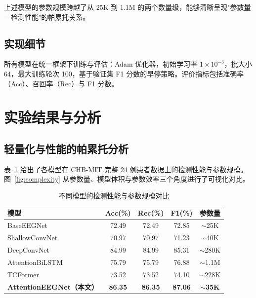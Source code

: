\documentclass[12pt, a4paper]{article}
\begin{document}
上述模型的参数规模跨越了从 25K 到 1.1M 的两个数量级，能够清晰呈现"参数量—检测性能"的帕累托关系。

\subsection{实现细节}

所有模型在统一框架下训练与评估：Adam 优化器\cite{ref_kingma2015}，初始学习率 $1 \times 10^{-3}$，批大小 64，最大训练轮次 100，基于验证集 F1 分数的早停策略。评价指标包括准确率（Acc）、召回率（Rec）与 F1 分数。

\section{实验结果与分析}

\subsection{轻量化与性能的帕累托分析}

表~\ref{tab:overall} 给出了各模型在 CHB-MIT 完整 24 例患者数据上的检测性能与参数规模。图~\ref{fig:complexity} 从参数量、模型体积与参数效率三个角度进行了可视化对比。

\begin{table}[H]
\centering
\caption{不同模型的检测性能与参数规模对比}
\label{tab:overall}
\begin{tabular}{lcccc}
\toprule
\textbf{模型} & \textbf{Acc(\%)} & \textbf{Rec(\%)} & \textbf{F1(\%)} & \textbf{参数量} \\
\midrule
BaseEEGNet\cite{ref_lawhern2018}     & 72.49 & 72.49 & 72.85 & $\sim$25K  \\
ShallowConvNet\cite{ref_schirrmeister2017} & 70.97 & 70.97 & 71.23 & $\sim$40K  \\
DeepConvNet\cite{ref_schirrmeister2017}    & 84.99 & 84.99 & 85.31 & $\sim$280K \\
AttentionBiLSTM\cite{ref_tsiouris2018} & 75.79 & 75.79 & 76.88 & $\sim$1.1M \\
TCFormer & 73.52 & 73.52 & 74.10 & $\sim$228K \\
\textbf{AttentionEEGNet（本文）}      & \textbf{86.35} & \textbf{86.35} & \textbf{87.06} & $\sim$\textbf{35K} \\
\bottomrule
\end{tabular}
\end{table}
\end{document}
